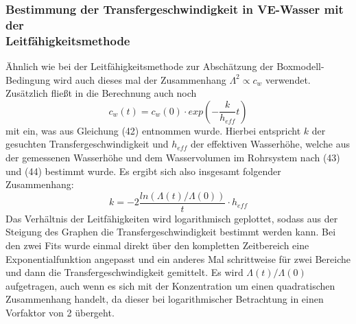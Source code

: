 \documentclass[12pt]{article}
\begin{document}
\subsubsection{Bestimmung der Transfergeschwindigkeit in VE-Wasser mit der \\
Leitfähigkeitsmethode}

Ähnlich wie bei der Leitfähigkeitsmethode zur Abschätzung der Boxmodell-Bedingung wird auch dieses mal der Zusammenhang $\Lambda ^2 \propto c_w $ verwendet. Zusätzlich fließt in die Berechnung auch noch
\begin{equation}
c_w(t) = c_w(0) \cdot exp(-\frac{k}{h_{eff}}t)
\end{equation}
mit ein, was aus Gleichung (42) \cite{jaehne} entnommen wurde. Hierbei entspricht $k$ der gesuchten Transfergeschwindigkeit und $h_{eff}$ der effektiven Wasserhöhe, welche aus der gemessenen Wasserhöhe und dem Wasservolumen im Rohrsystem nach \cite{jaehne} (43) und (44) bestimmt wurde. Es ergibt sich also insgesamt folgender Zusammenhang:
\begin{equation}
k = -2 \frac{ln(\Lambda (t)/\Lambda (0))}{t} \cdot h_{eff}
\end{equation}
Das Verhältnis der Leitfähigkeiten wird logarithmisch geplottet, sodass aus der Steigung des Graphen die Transfergeschwindigkeit bestimmt werden kann. Bei den zwei Fits wurde einmal direkt über den kompletten Zeitbereich eine Exponentialfunktion angepasst und ein anderes Mal schrittweise für zwei Bereiche und dann die Transfergeschwindigkeit gemittelt.
Es wird $\Lambda (t)/\Lambda (0)$ aufgetragen, auch wenn es sich mit der Konzentration um einen quadratischen Zusammenhang handelt, da dieser bei logarithmischer
Betrachtung in einen Vorfaktor von 2 übergeht.
\end{document}
